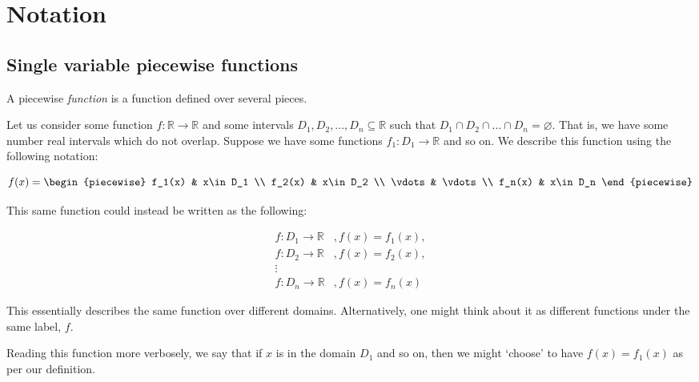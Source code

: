\section{Notation}
\subsection{Single variable piecewise functions}
A piecewise \textit{function} is a function defined over several pieces. 

Let us consider some function $f:\mathbb{R}\to\mathbb{R}$ and some intervals ${D_1,D_2,\dots,D_n\subseteq\mathbb{R}}$ such that ${D_1\cap D_2\cap \dots\cap D_n=\varnothing}$. That is, we have some number real intervals which do not overlap. Suppose we have some functions $f_1: D_1\to\mathbb{R}$ and so on. We describe this function using the following notation:

$$
    f(x) = \begin{piecewise} 
                f_1(x) & x\in D_1 \\
                f_2(x) & x\in D_2 \\
                \vdots & \vdots \\
                f_n(x) & x\in D_n
            \end{piecewise}
$$

This same function could instead be written as the following:

\begin{align*}
    f:D_1\to\mathbb{R}&, f(x)=f_1(x), \\
    f:D_2\to\mathbb{R}&, f(x)=f_2(x), \\
    \vdots \\
    f:D_n\to\mathbb{R}&, f(x)=f_n(x)
\end{align*}

This essentially describes the same function over different domains. Alternatively, one might think about it as different functions under the same label, $f$.

Reading this function more verbosely, we say that if $x$ is in the domain $D_1$ and so on, then we might `choose' to have $f(x)=f_1(x)$ as per our definition.

